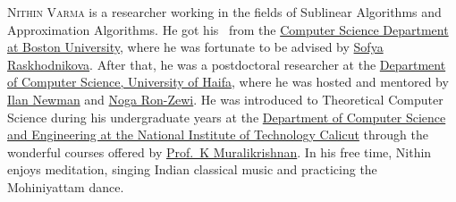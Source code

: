 \documentclass{toc}
\begin{document}
\begin{tocaboutauthors}
\begin{tocabout}[varma]
  \textsc{Nithin Varma} is a researcher working in the fields of Sublinear Algorithms and Approximation Algorithms. He got his \phd\ from the \href{https://www.bu.edu/cs/}{Computer Science Department at Boston University}, where he was fortunate to be advised by
%
\href{https://cs-people.bu.edu/sofya/}{Sofya Raskhodnikova}.
%
    After that, he was a postdoctoral researcher at the \href{https://cs.hevra.haifa.ac.il/?lang=en}{Department of Computer Science, University of Haifa}, where he was hosted and mentored by 
%
\href{http://cs.haifa.ac.il/~ilan/}{Ilan Newman} %
and
%
\href{https://sites.google.com/view/nogazewi}{Noga Ron-Zewi}. 
%
He was introduced to Theoretical Computer Science during his undergraduate years at the \href{https://minerva.nitc.ac.in/}{Department of Computer Science and Engineering at the National Institute of Technology Calicut} through the wonderful courses offered by
\href{https://people.cse.nitc.ac.in/muralikrishnan/}{Prof.\ K Muralikrishnan}. 
In his free time, Nithin enjoys meditation, singing Indian classical music and practicing the Mohiniyattam dance.
\end{tocabout}
\end{tocaboutauthors}
\end{document}
